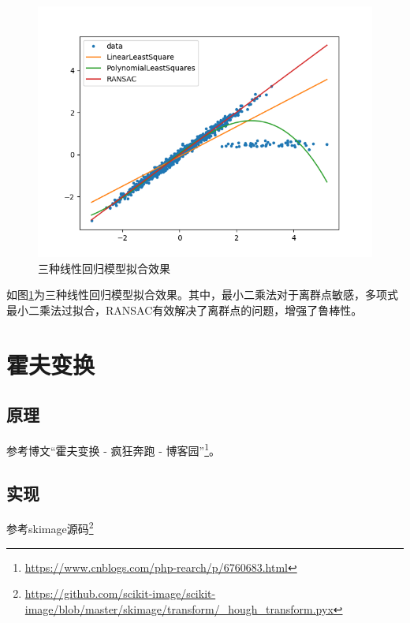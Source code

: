 \documentclass{article}
\begin{document}
\begin{figure}[ht]
	\centering
	\includegraphics{../code/img/LinearRegression.png}
	\caption{三种线性回归模型拟合效果}
	\label{fig:Lr}
\end{figure}

如图\ref{fig:Lr}为三种线性回归模型拟合效果。其中，最小二乘法对于离群点敏感，多项式最小二乘法过拟合，RANSAC有效解决了离群点的问题，增强了鲁棒性。

\section{霍夫变换}

\subsection{原理}

参考博文``霍夫变换 - 疯狂奔跑 - 博客园''\footnote{\url{https://www.cnblogs.com/php-rearch/p/6760683.html}}。

\subsection{实现}

参考skimage源码\footnote{\url{https://github.com/scikit-image/scikit-image/blob/master/skimage/transform/\_hough\_transform.pyx}}
\end{document}
